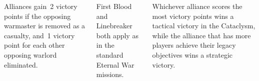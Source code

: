 \begin{columns}
  Alliances gain~2 victory points if the opposing warmaster is removed
  as a casualty, and~1 victory point for each other opposing warlord
  eliminated.

  First Blood and Linebreaker both apply as in the standard Eternal
  War missions.


  Whichever alliance scores the most victory points wins a tactical
  victory in the Cataclysm, while the alliance that has more players
  achieve their legacy objectives wins a strategic victory.

\end{columns}
